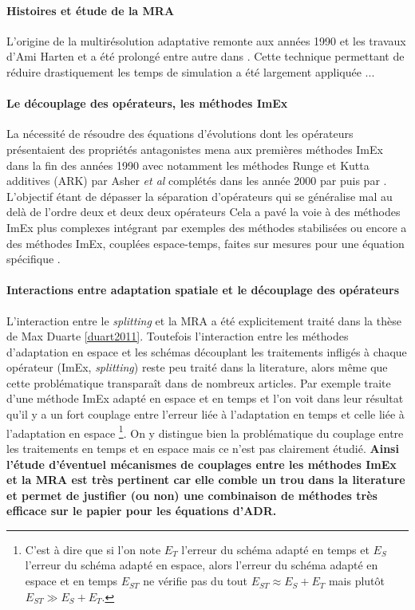     \paragraph{Histoires et étude de la MRA}
    L'origine de la multirésolution adaptative remonte aux années 1990 et les travaux d'Ami Harten \cite{harten1994} et a été prolongé entre autre dans \cite{Kaibara2001,Cohen2003}.
    Cette technique permettant de réduire drastiquement les temps de simulation a été largement appliquée \cite{}...

    \paragraph{Le découplage des opérateurs, les méthodes ImEx}
    La nécessité de résoudre des équations d'évolutions dont les opérateurs présentaient des propriétés antagonistes mena aux premières méthodes ImEx dans la fin des années 1990 
    avec notamment les méthodes Runge et Kutta additives (ARK) par Asher \textit{et al} \cite{ASCHER1997151} complétés dans les année 2000 par \cite{KENNEDY2003139} puis par \cite{FITZHUGH1961445}. 
    L'objectif étant de dépasser la séparation d'opérateurs \cite{Strang1968} qui se généralise mal au delà de l'ordre deux et deux deux opérateurs \cite{}%
    Cela a pavé la voie à des méthodes ImEx plus complexes intégrant par exemples des méthodes stabilisées \cite{Abdulle2013} 
    ou encore a des méthodes ImEx, couplées espace-temps, faites sur mesures pour une équation spécifique \cite{rebou2024}.

    \paragraph{Interactions entre adaptation spatiale et le découplage des opérateurs}
        L'interaction entre le \textit{splitting} et la MRA a été explicitement traité dans la thèse de Max Duarte \ref{duart2011}.    
        Toutefois l'interaction entre les méthodes d'adaptation en espace et les schémas découplant les traitements infligés à chaque opérateur (ImEx, \textit{splitting})
        reste peu traité dans la literature, alors même que cette problématique transparaît dans de nombreux articles.
        Par exemple \cite{Zhang2025IMEXTSA} traite d'une méthode ImEx adapté en espace et en temps et l'on voit dans leur résultat qu'il y a un fort 
        couplage entre l'erreur liée à l'adaptation en temps et celle liée à l'adaptation en espace
        \footnote{C'est à dire que si l'on note $E_T$ l'erreur du schéma adapté en temps et $E_S$ l'erreur du schéma adapté en espace,
        alors l'erreur du schéma adapté en espace et en temps $E_{ST}$ ne vérifie pas du tout $E_{ST}\approx E_S + E_T$ mais plutôt $E_{ST} \gg E_S + E_T$.}. 
        On y distingue bien la problématique du couplage entre les traitements en temps et en espace mais ce n'est pas clairement étudié.
        \textbf{Ainsi l'étude d'éventuel mécanismes de couplages entre les méthodes ImEx et la MRA est très pertinent car elle comble un trou dans la literature et permet de justifier (ou non) une combinaison de méthodes très efficace sur le papier pour les équations d'ADR.}
